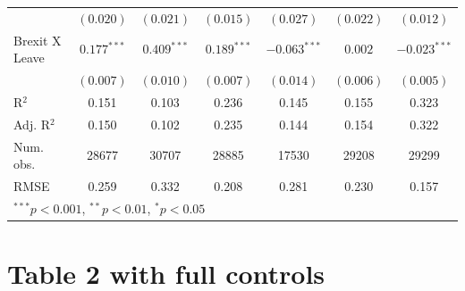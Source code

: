 \documentclass[12pt, letter]{article}
\begin{document}
\begin{table}[H]
\begin{center}
{\begin{tabular}{l c c c c c c}
                                 & $(0.020)$      & $(0.021)$      & $(0.015)$      & $(0.027)$      & $(0.022)$      & $(0.012)$      \\
Brexit X Leave                   & $0.177^{***}$  & $0.409^{***}$  & $0.189^{***}$  & $-0.063^{***}$ & $0.002$        & $-0.023^{***}$ \\
                                 & $(0.007)$      & $(0.010)$      & $(0.007)$      & $(0.014)$      & $(0.006)$      & $(0.005)$      \\
\hline
R$^2$                            & 0.151          & 0.103          & 0.236          & 0.145          & 0.155          & 0.323          \\
Adj. R$^2$                       & 0.150          & 0.102          & 0.235          & 0.144          & 0.154          & 0.322          \\
Num. obs.                        & 28677          & 30707          & 28885          & 17530          & 29208          & 29299          \\
RMSE                             & 0.259          & 0.332          & 0.208          & 0.281          & 0.230          & 0.157          \\
\hline
\multicolumn{7}{l}{\scriptsize{$^{***}p<0.001$, $^{**}p<0.01$, $^*p<0.05$}}
\end{tabular}}
\end{center}
\end{table}

\section{Table 2 with full controls} \label{appendix6monthfull}
\end{document}
